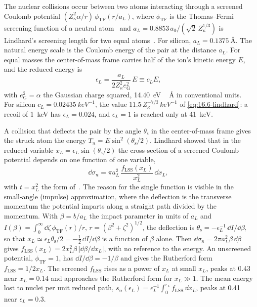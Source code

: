 The nuclear collisions occur between two atoms interacting through a screened Coulomb potential $(Z_\kappa^2\alpha/r)\,\phi_{\mathrm{TF}}(r/a_L)$, where $\phi_{\mathrm{TF}}$ is the Thomas--Fermi screening function of a neutral atom~\cite{thomas1927calculation,fermi1928statistische} and $a_L = 0.8853\,a_0/(\sqrt2\,Z_\kappa^{1/3})$ is Lindhard's screening length for two equal atoms~\cite[Sect.~II\,A]{sorensen2015atomic}. For silicon, $a_L = \SI{0.1375}{\angstrom}$. The natural energy scale is the Coulomb energy of the pair at the distance $a_L$. For equal masses the center-of-mass frame carries half of the ion's kinetic energy $E$, and the reduced energy is
\begin{equation}
  \epsilon_L = \frac{a_L}{2Z_\kappa^2e_{\mathrm{G}}^2}\,E \equiv c_L E ,
  \label{eq:19.3-reduced}
\end{equation}
with $e_{\mathrm{G}}^2 = \alpha$ the Gaussian charge squared, \SI{14.40}{eV\,\angstrom} in conventional units. For silicon $c_L = \SI{0.02435}{keV^{-1}}$, the value $11.5\,Z_\kappa^{-7/3}\,\si{keV^{-1}}$ of \cref{eq:16.6-lindhard}: a recoil of \SI{1}{keV} has $\epsilon_L = 0.024$, and $\epsilon_L = 1$ is reached only at \SI{41}{keV}.

A collision that deflects the pair by the angle $\theta_{\mathrm{s}}$ in the center-of-mass frame gives the struck atom the energy $T_n = E\sin^2(\theta_{\mathrm{s}}/2)$. Lindhard showed that in the reduced variable $x_L = \epsilon_L\sin(\theta_{\mathrm{s}}/2)$ the cross-section of a screened Coulomb potential depends on one function of one variable,
\begin{equation}
  \dd\sigma_n = \pi a_L^2\,\frac{f_{\mathrm{LSS}}(x_L)}{x_L^2}\,\dd x_L ,
  \label{eq:19.3-dsigma}
\end{equation}
with $t = x_L^2$ the form of~\cite[Eq.~(2)]{sarkis2023ionization}. The reason for the single function is visible in the small-angle (impulse) approximation, where the deflection is the transverse momentum the potential imparts along a straight path divided by the momentum. With $\beta = b/a_L$ the impact parameter in units of $a_L$ and $I(\beta) = \int_0^\infty\dd\zeta\,\phi_{\mathrm{TF}}(r)/r$, $r = (\beta^2 + \zeta^2)^{1/2}$, the deflection is $\theta_{\mathrm{s}} = -\epsilon_L^{-1}\,\dd I/\dd\beta$, so that $x_L \simeq \epsilon_L\theta_{\mathrm{s}}/2 = -\tfrac12\,\dd I/\dd\beta$ is a function of $\beta$ alone. Then $\dd\sigma_n = 2\pi a_L^2\beta\,\dd\beta$ gives $f_{\mathrm{LSS}}(x_L) = 2x_L^2\beta\,|\dd\beta/\dd x_L|$, with no reference to the energy. An unscreened potential, $\phi_{\mathrm{TF}} = 1$, has $\dd I/\dd\beta = -1/\beta$ and gives the Rutherford form $f_{\mathrm{LSS}} = 1/2x_L$. The screened $f_{\mathrm{LSS}}$ rises as a power of $x_L$ at small $x_L$, peaks at 0.43 near $x_L = 0.14$ and approaches the Rutherford form for $x_L \gg 1$. The mean energy lost to nuclei per unit reduced path, $s_n(\epsilon_L) = \epsilon_L^{-1}\int_0^{\epsilon_L}f_{\mathrm{LSS}}\,\dd x_L$, peaks at 0.41 near $\epsilon_L = 0.3$.

